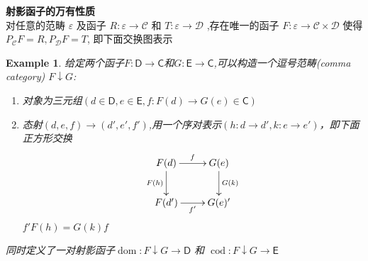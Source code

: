 \documentclass[UTF8,11pt,a4paper]{ctexart}
\newtheorem{example}[theorem]{Example}
\newcommand{\sC}{\mathsf{C}}
\newcommand{\sD}{\mathsf{D}}
\newcommand{\sE}{\mathsf{E}}
\newcommand*{\xfunc}[4]{{#2}\colon{#3}{#1}{#4}}
\newcommand*{\func}[3]{\xfunc{\to}{#1}{#2}{#3}}
\newcommand*{\qty}[1]{\left({#1}\right)}
\DeclareMathOperator{\dom}{dom}
\DeclareMathOperator{\cod}{cod}
\begin{document}
\begin{flushleft}
\textbf{射影函子的万有性质} \\
对任意的范畴 $\varepsilon$ 及函子 $R\colon \varepsilon \rightarrow \mathcal{C}$    和 $T\colon \varepsilon \rightarrow \mathcal{D}$ ,存在唯一的函子 $F\colon \varepsilon \rightarrow \mathcal{C}\times\mathcal{D}$ 使得 $P_{\mathcal{C}}F=R,P_{\mathcal{D}}F=T$, 即下面交换图表示
\end{flushleft}

\begin{center}
\end{center}


\begin{example}
给定两个函子$\func{F}{\sD}{\sC}$和$\func{G}{\sE}{\sC}$,可以构造一个逗号范畴(comma category) $F \downarrow G$:
	\begin{enumerate}
		\item 对象为三元组$(d \in \sD,e\in \sE,\func{f}{F(d)}{G(e)} \in \sC)$
		\item 态射$\qty{d,e,f} \rightarrow \qty{d',e',f'}$,用一个序对表示$\qty{\func{h}{d}{d'},\func{k}{e}{e'}}$，即下面正方形交换
		\[\xymatrix{
					F(d) \ar[d]_{F(h)} \ar[r]^{f} & G(e)\ar[d]^{G(k)}  \\
			F(d')\ar[r]_{f'} &G(e)'}\]
			$f'F(h) = G(k)f$
	\end{enumerate}
	同时定义了一对射影函子$\func{\dom}{F\downarrow G}{\sD}$ 和
	$\func{\cod}{F\downarrow G}{\sE}$	
\end{example}
\end{document}
